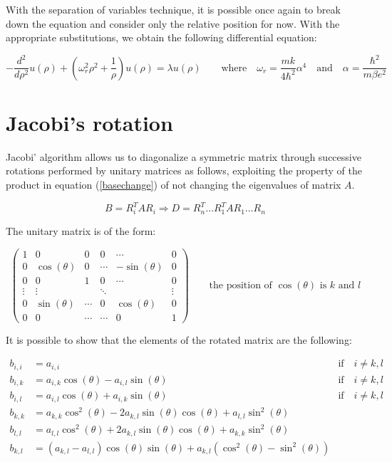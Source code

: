 \documentclass {article}
\begin{document}
With the separation of variables technique, it is possible once again to break down the equation and consider only the relative position for now. With the appropriate substitutions, we obtain the following differential equation:

\begin{equation}
- \frac{d^2}{d \rho^2} u(\rho) +\left(\omega_r^2 \rho^2 +\frac{1}{\rho} \right) u(\rho)=\lambda u(\rho) \quad \quad \mbox{where} \quad \omega_r=\frac{mk}{4 \hbar^2} \alpha^4 \quad \mbox{and} \quad \alpha=\frac{\hbar^2}{m \beta e^2}
\label{chc}
\end{equation}

\section{Jacobi's rotation}

Jacobi' algorithm allows us to diagonalize a symmetric matrix through successive rotations performed by unitary matrices as follows, exploiting the property of the product in equation (\ref{basechange}) of not changing the eigenvalues of matrix $A$.

\begin{equation}
B=R_i^T A R_i \Longrightarrow D=R_n^T\dots R_1^T A R_1 \dots R_n
\label{basechange}
\end{equation}

The unitary matrix is of the form:

\begin{equation}
\begin{pmatrix}
   1 & 0 &  0 & 0 & \cdots & 0  \\
  0 &  \cos(\theta) & 0 & \cdots & -\sin(\theta) & 0  \\
   0 & 0 &  1 & 0 & \cdots & 0 \\   
  \vdots  & \vdots  & & \ddots & & \vdots   \\
   0 &  \sin(\theta) & \cdots  & 0 & \cos(\theta) & 0 \\
   0 &  0 & \cdots & \cdots  & 0 & 1
 \end{pmatrix}
 \quad \quad\mbox{the position of $\cos(\theta)$ is $k$ and $l$}
\end{equation}

It is possible to show that the elements of the rotated matrix are the following:

\begin{align}
b_{i, i}&=a_{i, i} & \mbox{if} \quad i\neq k, l\\
b_{i, k}&=a_{i, k} \cos (\theta) - a_{i, l} \sin(\theta) & \mbox{if} \quad i\neq k, l\\
b_{i, l}&=a_{i, l} \cos (\theta) + a_{i, k} \sin(\theta) & \mbox{if} \quad i\neq k, l\\
b_{k, k}&=a_{k, k} \cos^2 (\theta) -2 a_{k, l} \sin (\theta) \cos (\theta)+ a_{l, l} \sin^2(\theta) &\\
b_{l, l}&=a_{l, l} \cos^2 (\theta) +2 a_{k, l} \sin (\theta) \cos (\theta)+ a_{k, k} \sin^2(\theta) &\\
b_{k, l}&=(a_{k, l}-a_{l, l} )\cos (\theta) \sin(\theta)+ a_{k, l}(\cos^2(\theta)- \sin^2 (\theta)) &
\label{values}
\end{align}
\end{document}
